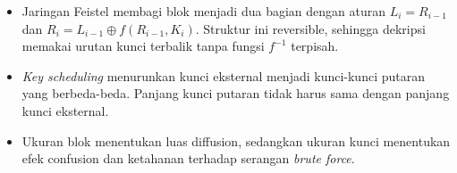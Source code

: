 \begin{itemize}
          mendukung pemrosesan paralel dan akses acak. Nilai counternya harus
          berbeda untuk setiap blok dan tidak dapat diprediksi.
    \item Jaringan Feistel membagi blok menjadi dua bagian dengan aturan
          $L_i=R_{i-1}$ dan $R_i=L_{i-1}\oplus f(R_{i-1},K_i)$. Struktur ini
          reversible, sehingga dekripsi memakai urutan kunci terbalik tanpa
          fungsi $f^{-1}$ terpisah.
    \item \textit{Key scheduling} menurunkan kunci eksternal menjadi kunci-kunci
          putaran yang berbeda-beda. Panjang kunci putaran tidak harus sama
          dengan panjang kunci eksternal.
    \item Ukuran blok menentukan luas diffusion, sedangkan ukuran kunci
          menentukan efek confusion dan ketahanan terhadap serangan
          \textit{brute force}.
\end{itemize}
